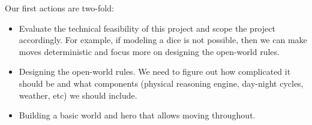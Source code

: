 \documentclass[10pt]{article}
\begin{document}
Our first actions are two-fold:

\begin{itemize}
\item Evaluate the technical feasibility of this project and scope the project accordingly. For example, if modeling a dice is not possible, then we can make moves deterministic and focus more on designing the open-world rules.
\item Designing the open-world rules. We need to figure out how complicated it should be and what components (physical reasoning engine, day-night cycles, weather, etc) we should include.
\item Building a basic world and hero that allows moving throughout.
\end{itemize}




\end{document}

